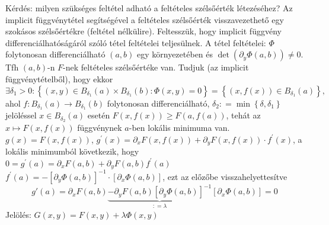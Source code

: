 \documentclass[12pt,a4paper]{scrartcl}
\begin{document}
Kérdés: milyen szükséges feltétel adható a feltételes szélsőérték
létezéséhez? Az implicit függvénytétel segítségével a feltételes
szélsőérték visszavezethető egy szokásos szélsőértékre (feltétel
nélkülire). Feltesszük, hogy implicit függvény differenciálhatóságáról
szóló tétel feltételei teljesülnek. A tétel feltételei: \(\Phi\)
folytonosan differenciálható \(\left( {a,b} \right)\) egy környezetében
és \(\det\left( {\partial_{y}\Phi\left( {a,b} \right)} \right) \neq 0\).
Tfh \(\left( {a,b} \right)\)-n \(F\)-nek feltételes szélsőértéke van.
Tudjuk (az implicit függvénytételből), hogy ekkor
\[\exists\delta_{1} > 0:\left\{ {\left( {x,y} \right) \in B_{\delta_{1}}\left( a \right) \times B_{\delta_{1}}\left( b \right):\Phi\left( {x,y} \right) = 0} \right\} = {\left\{ {\left( {x,f\left( x \right)} \right) \in B_{\delta_{1}}\left( a \right)} \right\},}\]
ahol
\(\left. f:B_{\delta_{1}}\left( a \right)\rightarrow B_{\delta_{1}}\left( b \right) \right.\)
folytonosan differenciálható,
\(\delta_{2}: = \min\left\{ {\delta,\delta_{1}} \right\}\) jelöléssel
\(x \in B_{\delta_{2}}\left( a \right)\) esetén
\(F\left( {x,f\left( x \right)} \right) \geq F\left( {a,f\left( a \right)} \right)\),
tehát az
\(\left. x\mapsto F\left( {x,f\left( x \right)} \right) \right.\)
függvénynek \(a\)-ben lokális minimuma van.\\
\(g\left( x \right) = F\left( {x,f\left( x \right)} \right)\),
\(g^{\prime}\left( x \right) = \partial_{x}F\left( {x,f\left( x \right)} \right) + \partial_{y}F\left( {x,f\left( x \right)} \right) \cdot f^{\prime}\left( x \right)\),
a lokális minimumból következik, hogy
\(0 = g^{\prime}\left( a \right) = \partial_{x}F\left( {a,b} \right) + \partial_{y}F\left( {a,b} \right)f^{\prime}\left( a \right)\)
\(f^{\prime}\left( a \right) = - \left\lbrack {\partial_{y}\Phi\left( {a,b} \right)} \right\rbrack^{- 1} \cdot \left\lbrack {\partial_{x}\Phi\left( {a,b} \right)} \right\rbrack\),
ezt az előzőbe visszahelyettesítve
\[g'\left( a \right) = {\partial _x}F\left( {a,b} \right)\underbrace { - {\partial _y}F\left( {a,b} \right){{\left[ {{\partial _y}\Phi \left( {a,b} \right)} \right]}^{ - 1}}}_{: = \lambda }\left[ {{\partial _x}\Phi \left( {a,b} \right)} \right] = 0\]
Jelölés:
\(G\left( {x,y} \right) = F\left( {x,y} \right) + \lambda\Phi\left( {x,y} \right)\)
\end{document}
